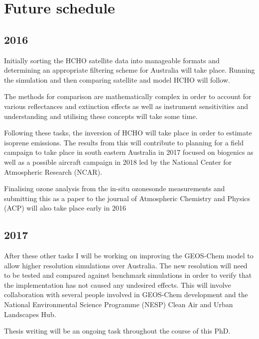 \section{Future schedule}

\subsection{2016}

Initially sorting the HCHO satellite data into manageable formats and determining an appropriate filtering scheme for Australia will take place.
Running the simulation and then comparing satellite and model HCHO will follow.

The methods for comparison are mathematically complex in order to account for various reflectances and extinction effects as well as instrument sensitivities and understanding and utilising these concepts will take some time.

Following these tasks, the inversion of HCHO will take place in order to estimate isoprene emissions.
The results from this will contribute to planning for a field campaign to take place in south eastern Australia in 2017 focused on biogenics as well as a possible aircraft campaign in 2018 led by the National Center for Atmospheric Research (NCAR).

Finalising ozone analysis from the in-situ ozonesonde measurements and submitting this as a paper to the journal of Atmospheric Chemistry and Physics (ACP) will also take place early in 2016

\subsection{2017}
After these other tasks I will be working on improving the GEOS-Chem model to allow higher resolution simulations over Australia.
The new resolution will need to be tested and compared against benchmark simulations in order to verify that the implementation has not caused any undesired effects.
This will involve collaboration with several people involved in GEOS-Chem development and the National Environmental Science Programme (NESP) Clean Air and Urban Landscapes Hub.

Thesis writing will be an ongoing task throughout the course of this PhD.